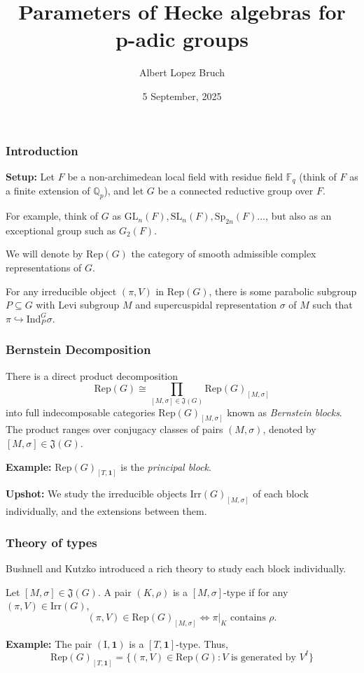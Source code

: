 \documentclass{beamer}
\title{Parameters of Hecke algebras for p-adic groups}
\author{Albert Lopez Bruch}
\date{5 September, 2025}
\newcommand{\Rep}{\mathrm{Rep}}
\newcommand{\Irr}{\mathrm{Irr}}
\newcommand{\Ind}{\mathrm{Ind}}
\newcommand{\GL}{\mathrm{GL}}
\newcommand{\SL}{\mathrm{SL}}
\newcommand{\Sp}{\mathrm{Sp}}
\newcommand{\QQ}{\mathbb{Q}}
\theoremstyle{plain}
\begin{document}
\frame{\titlepage}


\begin{frame}
    \frametitle{Introduction}
    \textbf{Setup:} Let $F$ be a non-archimedean local field with residue field $\mathbb{F}_q$ (think of $F$ as a finite extension of $\QQ_p$), and let $G$ be a connected reductive group over $F$.
    \vspace{0.3cm}

    For example, think of $G$ as $\GL_n(F), \SL_n(F), \Sp_{2n}(F)\ldots$, but also as an exceptional group such as $G_2(F)$.
    \vspace{0.3cm}

    We will denote by $\Rep(G)$ the category of smooth admissible complex representations of $G$.

    \begin{fact}
        For any irreducible object $(\pi,V)$ in $\Rep(G)$, there is some parabolic subgroup $P\subseteq G$ with Levi subgroup $M$ and supercuspidal representation $\sigma$ of $M$ such that $\pi\hookrightarrow\Ind_P^G\sigma$.
    \end{fact}
\end{frame}

\begin{frame}
    \frametitle{Bernstein Decomposition}
    \begin{theorem}[Bernstein]
        There is a direct product decomposition
        \[\Rep(G)\cong \prod_{[M,\sigma]\in\mathfrak{J}(G)}\Rep(G)_{[M,\sigma]}\]
        into full indecomposable categories $\Rep(G)_{[M,\sigma]}$ known as \textit{Bernstein blocks}. The product ranges over conjugacy classes of pairs $(M,\sigma)$, denoted by $[M,\sigma]\in\mathfrak{J}(G)$.
    \end{theorem}
    \textbf{Example:} $\Rep(G)_{[T,\mathbf{1}]}$ is the \textit{principal block}.
    \vspace{0.3cm}

    \textbf{Upshot:} We study the irreducible objects $\Irr(G)_{[M,\sigma]}$ of each block individually, and the extensions between them.
\end{frame}



\begin{frame}
    \frametitle{Theory of types}
    Bushnell and Kutzko introduced a rich theory to study each block individually.

    \begin{definition}[Types]
        Let $[M,\sigma]\in\mathfrak{J}(G)$. A pair $(K,\rho)$ is a $[M,\sigma]$-type if for any $(\pi,V)\in\Irr(G)$,
        \[(\pi,V)\in\Rep(G)_{[M,\sigma]}\iff \pi|_K \text{ contains }\rho.\]
    \end{definition}
    \textbf{Example:} The pair $(\text{I},\mathbf{1})$ is a $[T,\mathbf{1}]$-type. Thus, 
    \[\Rep(G)_{[T,\mathbf{1}]}=\{(\pi,V)\in\Rep(G):V\text{ is generated by }V^I\}\]
   
\end{frame}
\end{document}
